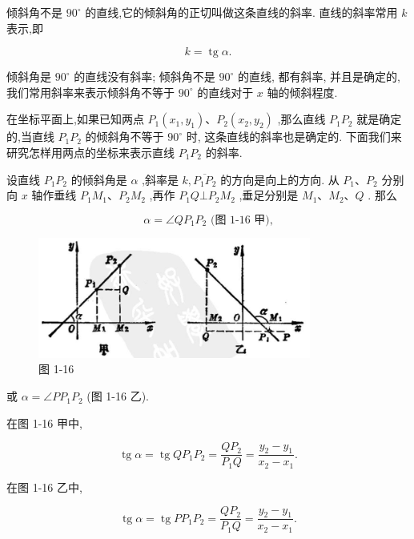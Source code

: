 \documentclass[lang=cn,newtx,10pt,scheme=chinese]{elegantbook}
\begin{document}
倾斜角不是 \({90}^{ \circ }\) 的直线,它的倾斜角的正切叫做这条直线的斜率. 直线的斜率常用 \(k\) 表示,即

\[
  k = \operatorname{tg}\alpha \text{.}
\]

倾斜角是 \({90}^{ \circ }\) 的直线没有斜率; 倾斜角不是 \({90}^{ \circ }\) 的直线, 都有斜率, 并且是确定的, 我们常用斜率来表示倾斜角不等于 \({90}^{ \circ }\) 的直线对于 \(x\) 轴的倾斜程度.

在坐标平面上,如果已知两点 \({P}_{1}\left( {{x}_{1},{y}_{1}}\right) \text{、}{P}_{2}\left( {{x}_{2},{y}_{2}}\right)\) ,那么直线 \({P}_{1}{P}_{2}\) 就是确定的,当直线 \({P}_{1}{P}_{2}\) 的倾斜角不等于 \({90}^{ \circ }\) 时, 这条直线的斜率也是确定的. 下面我们来研究怎样用两点的坐标来表示直线 \({P}_{1}{P}_{2}\) 的斜率.

设直线 \({P}_{1}{P}_{2}\) 的倾斜角是 \(\alpha\) ,斜率是 \(k,\overline{{P}_{1}{P}_{2}}\) 的方向是向上的方向. 从 \({P}_{1}\text{、}{P}_{2}\) 分别向 \(x\) 轴作垂线 \({P}_{1}{M}_{1}\text{、}{P}_{2}{M}_{2}\) ,再作 \({P}_{1}Q \bot {P}_{2}{M}_{2}\) ,垂足分别是 \({M}_{1}\text{、}{M}_{2}\text{、}Q\) . 那么

\[
  \alpha = \angle Q{P}_{1}{P}_{2}\text{ (图 1-16 甲),}
\]

\begin{figure}[h]
  \centering
  \includegraphics[max width=0.8\textwidth]{images/01912cc2-ffb6-728e-9ae7-b113ff05c64b_20_458905.jpg}
  \caption{图 1-16}
\end{figure}



或 \(\alpha = \angle P{P}_{1}{P}_{2}\) (图 1-16 乙).

在图 1-16 甲中,

\[
  \operatorname{tg}\alpha = \operatorname{tg}Q{P}_{1}{P}_{2} = \frac{Q{P}_{2}}{{P}_{1}Q} = \frac{{y}_{2} - {y}_{1}}{{x}_{2} - {x}_{1}}.
\]

在图 1-16 乙中,

\[
  \operatorname{tg}\alpha = \operatorname{tg}P{P}_{1}{P}_{2} = \frac{Q{P}_{2}}{{P}_{1}Q} = \frac{{y}_{2} - {y}_{1}}{{x}_{2} - {x}_{1}}.
\]
\end{document}
